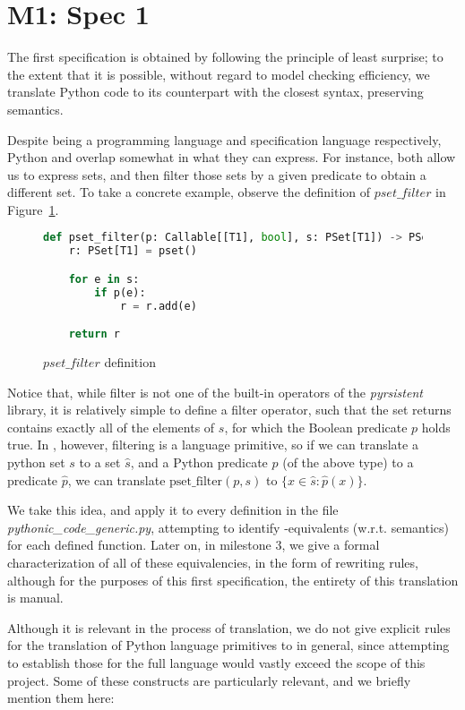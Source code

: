 
\section{M1: Spec 1}

The first specification is obtained by following the principle of least surprise; to the extent that it is possible, without regard to model checking efficiency, we translate Python code to its \tlap{} counterpart with the closest syntax, preserving semantics.

Despite being a programming language and specification language respectively, Python and \tlap{} overlap somewhat in what they can express. 
For instance, both allow us to express sets, and then filter those sets by a given predicate to obtain a different set.
To take a concrete example, observe the definition of $pset\_filter$ in Figure~\ref{py_filter}.
\begin{figure}
\begin{lstlisting}[language=Python]
def pset_filter(p: Callable[[T1], bool], s: PSet[T1]) -> PSet[T1]:
    r: PSet[T1] = pset()

    for e in s:
        if p(e):
            r = r.add(e)

    return r
\end{lstlisting}
\caption{$pset\_filter$ definition \label{py_filter}}
\end{figure}
%
Notice that, while filter is not one of the built-in operators of the \emph{pyrsistent} library, it is relatively simple to define a filter operator, such that the set returns contains exactly all of the elements of $s$, for which the Boolean predicate $p$ holds true.
In \tlap{}, however, filtering is a language primitive, so if we can translate a python set $s$ to a \tlap{} set $\hat{s}$, and a Python predicate $p$ (of the above type) to a \tlap{} predicate $\hat{p}$, we can translate $\mathrm{pset\_filter}(p, s)$ to $\{ x \in \hat{s}\colon \hat{p}(x) \}$.

We take this idea, and apply it to every definition in the file \emph{pythonic\_code\_generic.py}, attempting to identify \tlap{}-equivalents (w.r.t. semantics) for each defined function. 
Later on, in milestone 3, we give a formal characterization of all of these equivalencies, in the form of rewriting rules, although for the purposes of this first specification, the entirety of this translation is manual.

Although it is relevant in the process of translation, we do not give explicit rules for the translation of Python language primitives to \tlap{} in general, since attempting to establish those for the full language would vastly exceed the scope of this project. 
Some of these constructs are particularly relevant, and we briefly mention them here:
